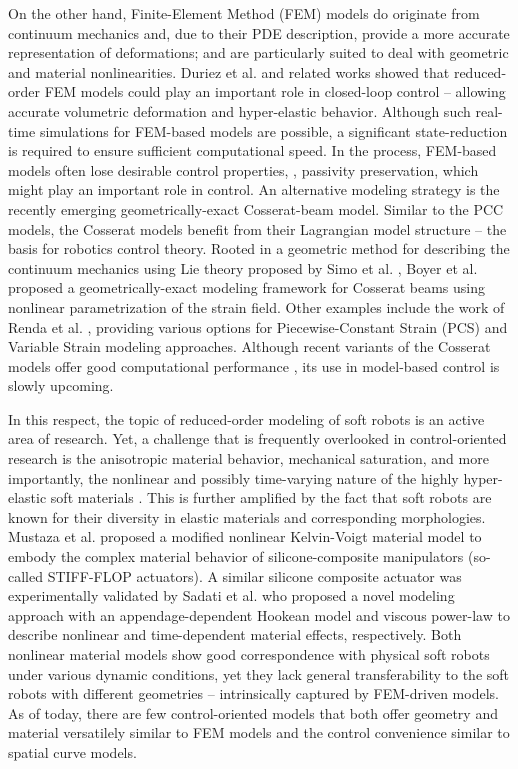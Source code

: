 On the other hand, Finite-Element Method (FEM) models do originate from continuum mechanics and, due to their PDE description, provide a more accurate representation of deformations; and are particularly suited to deal with geometric and material nonlinearities. Duriez et al. \cite{Duriez2013} and related works \cite{Coevoet2017,Largilliere2015,Goury2018} showed that reduced-order FEM models could play an important role in closed-loop control -- allowing accurate volumetric deformation and hyper-elastic behavior. Although such real-time simulations for FEM-based models are possible, a significant state-reduction is required to ensure sufficient computational speed. In the process, FEM-based models often lose desirable control properties, \eg, passivity preservation, which might play an important role in control. An alternative modeling strategy is the recently emerging geometrically-exact Cosserat-beam model. Similar to the PCC models, the Cosserat models benefit from their Lagrangian model structure  -- the basis for robotics control theory. Rooted in a geometric method for describing the continuum mechanics using Lie theory proposed by Simo et al. \cite{Simo1986}, Boyer et al. \cite{Boyer2010, Boyer2021} proposed a geometrically-exact modeling framework for Cosserat beams using nonlinear parametrization of the strain field. Other examples include the work of Renda et al. \cite{Renda2018,Renda2020}, providing various options for Piecewise-Constant Strain (PCS) and Variable Strain modeling approaches. Although recent variants of the Cosserat models offer good computational performance \cite{Till2019,Grazioso2019}, its use in model-based control is slowly upcoming.

In this respect, the topic of reduced-order modeling of soft robots is an active area of research. Yet, a challenge that is frequently overlooked in control-oriented research is the anisotropic material behavior, mechanical saturation, and more importantly, the nonlinear and possibly time-varying nature of the highly hyper-elastic soft materials \cite{Falkenhahn2015, Mochiyama2003, Till2019, Tatlicioglu2007}. This is further amplified by the fact that soft robots are known for their diversity in elastic materials and corresponding morphologies. Mustaza et al. \cite{Mustaza2019} proposed a modified nonlinear Kelvin-Voigt material model to embody the complex material behavior of silicone-composite manipulators (so-called STIFF-FLOP actuators). A similar silicone composite actuator was experimentally validated by Sadati et al.\cite{Sadati2020} who proposed a novel modeling approach with an appendage-dependent Hookean model and viscous power-law to describe nonlinear and time-dependent material effects, respectively. Both nonlinear material models show good correspondence with physical soft robots under various dynamic conditions, yet they lack general transferability to the soft robots with different geometries -- intrinsically captured by FEM-driven models. As of today, there are few control-oriented models that both offer geometry and material versatilely similar to FEM models and the control convenience similar to spatial curve models.

